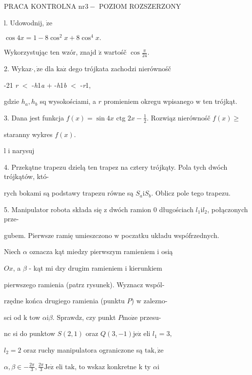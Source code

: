 \documentclass[a4paper,12pt]{article}
\begin{document}
PRACA KONTROLNA $\mathrm{n}\mathrm{r} 3-$ POZIOM ROZSZERZONY

l. Udowodnij, $\dot{\mathrm{z}}\mathrm{e}$

$\cos 4x=1-8\cos^{2}x+8\cos^{4}x.$

Wykorzystując ten wzór, znajd $\acute{\mathrm{z}}$ wartośč $\displaystyle \cos\frac{\pi}{24}.$

2. Wykaz$\cdot, \dot{\mathrm{z}}\mathrm{e}$ dla $\mathrm{k}\mathrm{a}\dot{\mathrm{z}}$ dego trójkata zachodzi nierównośč

-21  {\it r} $<$ -{\it h}1{\it a} $+$ -{\it h}1{\it b} $<$ -{\it r}1,

gdzie $h_{a}, h_{b}$ sq wysokościami, a $r$ promieniem okregu wpisanego $\mathrm{w}$ ten trójkąt.

3. Dana jest funkcja $f(x) = \sin 4x$ ctg $2x-\displaystyle \frac{1}{2}$. Rozwiąz nierównośč $f(x) \geq$

staranny wykres $f(x).$

l i narysuj

4. Przekątne trapezu dzielą ten trapez na cztery trójkąty. Pola tych dwóch trójkątów, któ-

rych bokami są podstawy trapezu równe są $S_{a}\mathrm{i}S_{b}$. Oblicz pole tego trapezu.

5. Manipulator robota składa się $\mathrm{z}$ dwóch ramion $0$ długościach $l_{1}\mathrm{i}l_{2}$, połączonych prze-

gubem. Pierwsze ramię umieszczono $\mathrm{w}$ poczatku układu wspófrzednych.

Niech $\alpha$ oznacza kąt miedzy pierwszym ramieniem $\mathrm{i}$ osią

$Ox$, a $\beta$ - kąt mi dzy drugim ramieniem $\mathrm{i}$ kierunkiem

pierwszego ramienia (patrz rysunek). Wyznacz wspól-

rzędne końca drugiego ramienia (punktu $P$) $\mathrm{w}$ zalezno-

sci od $\mathrm{k}$ tow $\alpha \mathrm{i}\beta$. Sprawdz, czy punkt $P\mathrm{m}\mathrm{o}\dot{\mathrm{z}}\mathrm{e}$ przesu-

$\mathrm{n} \mathrm{c}$ si do punktow $S(2,1)$ oraz $Q(3,-1)\mathrm{j}\mathrm{e}\dot{\mathrm{z}}$ eli $l_{1} =3,$

$l_{2} = 2$ oraz ruchy manipulatora ograniczone są $\mathrm{t}\mathrm{a}\mathrm{k}, \dot{\mathrm{z}}\mathrm{e}$

$\alpha, \beta\in -\displaystyle \frac{2\pi}{3}, \displaystyle \frac{2\pi}{3} \mathrm{J}\mathrm{e}\dot{\mathrm{z}}$ eli $\mathrm{t}\mathrm{a}\mathrm{k}$, to wskaz konkretne $\mathrm{k}$ ty $\alpha \mathrm{i}$
\end{document}
